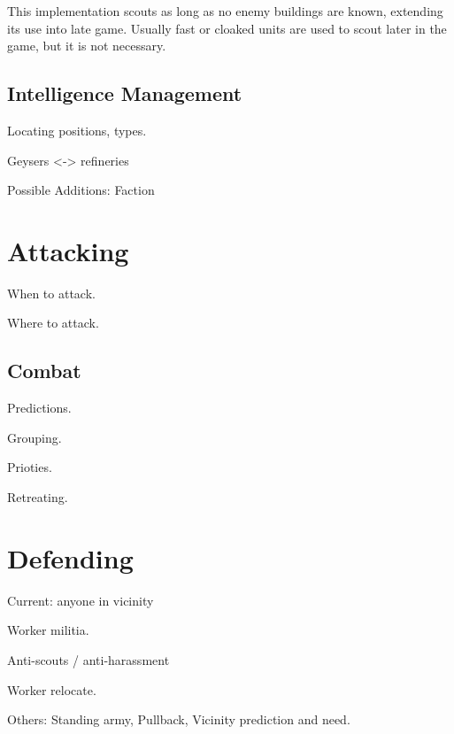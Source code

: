 		This implementation scouts as long as no enemy buildings are known, extending its use into late game. Usually fast or cloaked units are used to scout later in the game, but it is not necessary.
		
	\subsection{Intelligence Management}
	
	Locating positions, types.
	
	Geysers <-> refineries
	
	Possible Additions: Faction

\section{Attacking}

When to attack.

Where to attack.

	\subsection{Combat}
	
	Predictions.
	
	Grouping.
	
	Prioties.
	
	Retreating.
	
\section{Defending}

Current: anyone in vicinity

Worker militia.

Anti-scouts / anti-harassment

Worker relocate.

Others: Standing army, Pullback, Vicinity prediction and need.